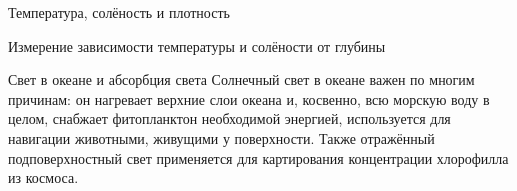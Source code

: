 \begin{chapter}{Температура, солёность и плотность}
\begin{section}{Измерение зависимости температуры и солёности от глубины}
\end{section}

\begin{section}{Свет в океане и абсорбция света}
Солнечный свет в океане важен по многим причинам: он нагревает верхние слои
океана и, косвенно, всю морскую воду в целом, снабжает фитопланктон необходимой 
энергией, используется для навигации животными, живущими у поверхности.
Также отражённый подповерхностный свет применяется для картирования
концентрации хлорофилла из космоса.
%


\end{section}
\end{chapter}
